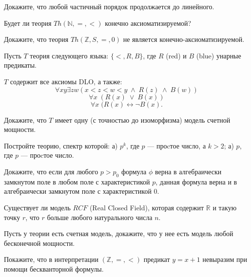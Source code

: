 \setcounter{curtask}{1}

\begin{task}
    Докажите, что любой частичный порядок продолжается до линейного.
\end{task}

\begin{task}
    Будет ли теория $Th(\mathbb{N}, =, <)$ конечно аксиоматизируемой?
\end{task}

\begin{task}
    Докажите, что теория $Th(\mathbb{Z}, S, =, 0)$ не является
    конечно-аксиоматизируемой.
\end{task}

\begin{task}
    Пусть $T$ теория следующего языка: $\{<, R, B\}$, где $R$ (red) и $B$ (blue)
    унарные предикаты.
    
	$T$ содержит все аксиомы DLO, а также: 
	\[ \forall xy \exists zw (x < z < w < y \; \wedge \; R(z) \; \wedge \; B(w)) \]
	\[ \forall x \; (R(x)\; \vee \; B(x)) \]
	\[ \forall x \; (R(x) \leftrightarrow \neg B(x). \]
    
	Докажите, что $T$ имеет одну (с точностью до изоморфизма) модель счетной
    мощности.
\end{task}


\begin{task}
    Постройте теорию, спектр которой:
    а) $p^k$, где $p$ --- проcтое число, а $k > 2$;
    а) $p$, где $p$ --- проcтое число.
\end{task}

\begin{task}
    Докажите, что если для любого $p > p_0$ формула $\phi$ верна в алгебраически
    замкнутом поле в любом поле с характеристикой $p$, данная формула верна и в
    алгебраически замкнутом поле с характеристикой 0.
\end{task}

\begin{task}
  	Существует ли модель $RCF$ (Real Closed Field), которая содержит $\mathbb{R}$ и
    такую точку $r$, что $r$ больше любого натурального числа $n$.
\end{task}

\begin{task}
    Пусть у теории есть счетная модель, докажите, что у нее есть модель любой
    бесконечной мощности.
\end{task}

\begin{task}
    Покажите, что в интерпретации $(\mathbb{Z}, =, <)$ предикат $y = x
    + 1$ невыразим при помощи бескванторной формулы.
\end{task}